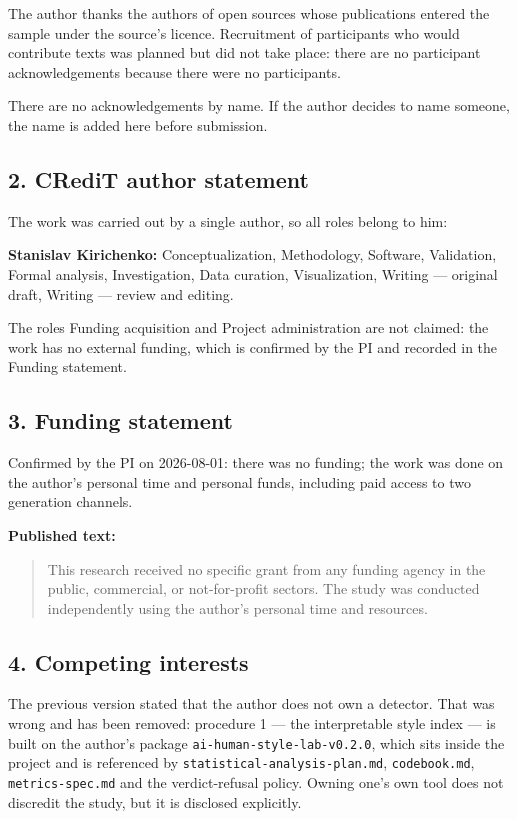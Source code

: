 \documentclass[11pt,a4paper]{article}
\renewcommand{\_}{\textunderscore\allowbreak}
\begin{document}
The author thanks the authors of open sources whose publications entered the
sample under the source's licence. Recruitment of participants who would
contribute texts was planned but did not take place: there are no participant
acknowledgements because there were no participants.

There are no acknowledgements by name. If the author decides to name someone, the
name is added here before submission.

\subsection{2. CRediT author statement}

The work was carried out by a single author, so all roles belong to him:

\textbf{Stanislav Kirichenko:} Conceptualization, Methodology, Software, Validation,
Formal analysis, Investigation, Data curation, Visualization, Writing — original
draft, Writing — review and editing.

The roles Funding acquisition and Project administration are not claimed: the work
has no external funding, which is confirmed by the PI and recorded in the Funding
statement.

\subsection{3. Funding statement}

Confirmed by the PI on 2026-08-01: there was no funding; the work was done on the
author's personal time and personal funds, including paid access to two generation
channels.

\textbf{Published text:}

\begin{quote}
This research received no specific grant from any funding agency in the public,
commercial, or not-for-profit sectors. The study was conducted independently using
the author's personal time and resources.
\end{quote}

\subsection{4. Competing interests}

The previous version stated that the author does not own a detector. That was wrong
and has been removed: procedure 1 — the interpretable style index — is built on the
author's package \texttt{ai-\allowbreak{}human-\allowbreak{}style-\allowbreak{}lab-\allowbreak{}v0.2.0}, which sits inside the project and is
referenced by \texttt{statistical-\allowbreak{}analysis-\allowbreak{}plan.md}, \texttt{codebook.md}, \texttt{metrics-\allowbreak{}spec.md} and
the verdict-refusal policy. Owning one's own tool does not discredit the study, but
it is disclosed explicitly.
\end{document}
